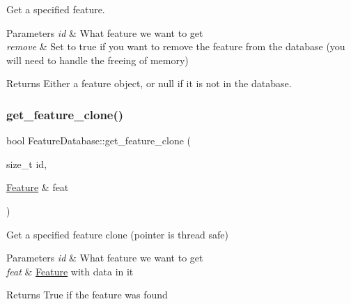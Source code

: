 Get a specified feature. 


\begin{DoxyParams}{Parameters}
{\em id} & What feature we want to get \\
\hline
{\em remove} & Set to true if you want to remove the feature from the database (you will need to handle the freeing of memory) \\
\hline
\end{DoxyParams}
\begin{DoxyReturn}{Returns}
Either a feature object, or null if it is not in the database. 
\end{DoxyReturn}
\mbox{\label{classov__core_1_1FeatureDatabase_a98e2d5320881107343b07f79cac8b541}} 
\subsubsection{\texorpdfstring{get\+\_\+feature\+\_\+clone()}{get\_feature\_clone()}}
{\footnotesize\ttfamily bool Feature\+Database\+::get\+\_\+feature\+\_\+clone (\begin{DoxyParamCaption}\item[{size\+\_\+t}]{id,  }\item[{\hyperlink{classov__core_1_1Feature}{Feature} \&}]{feat }\end{DoxyParamCaption})}



Get a specified feature clone (pointer is thread safe) 


\begin{DoxyParams}{Parameters}
{\em id} & What feature we want to get \\
\hline
{\em feat} & \hyperlink{classov__core_1_1Feature}{Feature} with data in it \\
\hline
\end{DoxyParams}
\begin{DoxyReturn}{Returns}
True if the feature was found 
\end{DoxyReturn}
\mbox{\label{classov__core_1_1FeatureDatabase_adf78008573a5aebe8a89cddbaf4b5b01}} 
